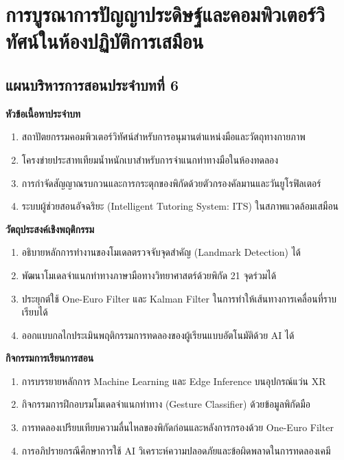 \chapter{การบูรณาการปัญญาประดิษฐ์และคอมพิวเตอร์วิทัศน์ในห้องปฏิบัติการเสมือน}
\label{chap:ch06}

\section*{แผนบริหารการสอนประจำบทที่ 6}

\noindent\textbf{หัวข้อเนื้อหาประจำบท}
\begin{enumerate}
    \item สถาปัตยกรรมคอมพิวเตอร์วิทัศน์สำหรับการอนุมานตำแหน่งมือและวัตถุทางกายภาพ
    \item โครงข่ายประสาทเทียมน้ำหนักเบาสำหรับการจำแนกท่าทางมือในห้องทดลอง
    \item การกำจัดสัญญาณรบกวนและการกระตุกของพิกัดด้วยตัวกรองคัลมานและวันยูโรฟิลเตอร์
    \item ระบบผู้ช่วยสอนอัจฉริยะ (Intelligent Tutoring System: ITS) ในสภาพแวดล้อมเสมือน
\end{enumerate}

\noindent\textbf{วัตถุประสงค์เชิงพฤติกรรม}
\begin{enumerate}
    \item อธิบายหลักการทำงานของโมเดลตรวจจับจุดสำคัญ (Landmark Detection) ได้
    \item พัฒนาโมเดลจำแนกท่าทางภาษามือทางวิทยาศาสตร์ด้วยพิกัด 21 จุดร่วมได้
    \item ประยุกต์ใช้ One-Euro Filter และ Kalman Filter ในการทำให้เส้นทางการเคลื่อนที่ราบเรียบได้
    \item ออกแบบกลไกประเมินพฤติกรรมการทดลองของผู้เรียนแบบอัตโนมัติด้วย AI ได้
\end{enumerate}

\newpage

\noindent\textbf{กิจกรรมการเรียนการสอน}
\begin{enumerate}
    \item การบรรยายหลักการ Machine Learning และ Edge Inference บนอุปกรณ์แว่น XR
    \item กิจกรรมการฝึกอบรมโมเดลจำแนกท่าทาง (Gesture Classifier) ด้วยข้อมูลพิกัดมือ
    \item การทดลองเปรียบเทียบความลื่นไหลของพิกัดก่อนและหลังการกรองด้วย One-Euro Filter
    \item การอภิปรายกรณีศึกษาการใช้ AI วิเคราะห์ความปลอดภัยและข้อผิดพลาดในการทดลองเคมี
\end{enumerate}

